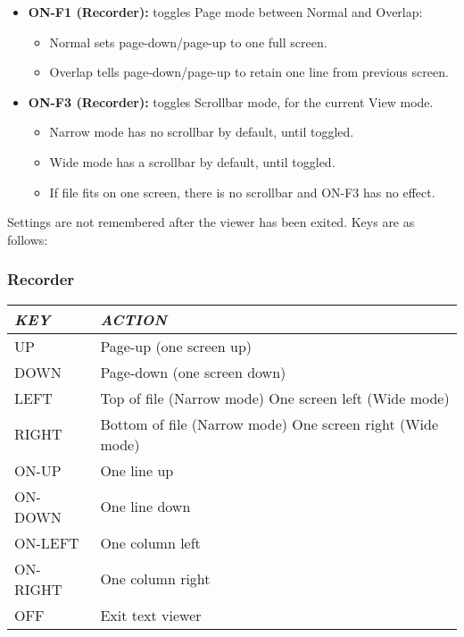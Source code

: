 \begin{itemize}
\item \textbf{ON{}-F1 (Recorder):} 
toggles Page mode between Normal and Overlap:

\begin{itemize}
\item Normal sets page{}-down/page{}-up to one full screen.
\item Overlap tells page{}-down/page{}-up to retain one line from
previous screen.
\end{itemize}

\item \textbf{ON{}-F3 (Recorder):} 
toggles Scrollbar mode, for the current View mode.

\begin{itemize}
\item Narrow mode has no scrollbar by default, until toggled.
\item Wide mode has a scrollbar by default, until toggled.
\item If file fits on one screen, there is no scrollbar and ON{}-F3 has
no effect.
\end{itemize}
\end{itemize}

Settings are not remembered after the viewer has been exited. 
Keys are as follows:

\subsubsection{Recorder}

\begin{tabular}[c]{|p{3.317cm}|p{7.104cm}|}
\hline
{\centering\bfseries\itshape
KEY
\par}
&
{\centering\bfseries\itshape
ACTION
\par}
\\\hline
{\centering
UP
\par}
&
Page{}-up (one screen up)
\\\hline
{\centering
DOWN
\par}
&
Page{}-down (one screen down)
\\\hline
{\centering
LEFT
\par}
&
Top of file (Narrow mode)\newline
One screen left (Wide mode)
\\\hline
{\centering
RIGHT
\par}
&
Bottom of file (Narrow mode)\newline
One screen right (Wide mode)
\\\hline
{\centering
ON{}-UP
\par}
&
One line up
\\\hline
{\centering
ON{}-DOWN
\par}
&
One line down
\\\hline
{\centering
ON{}-LEFT 
\par}
&
One column left
\\\hline
{\centering
ON{}-RIGHT
\par}
&
One column right
\\\hline
{\centering
OFF
\par}
&
Exit text viewer
\\\hline
\end{tabular}


